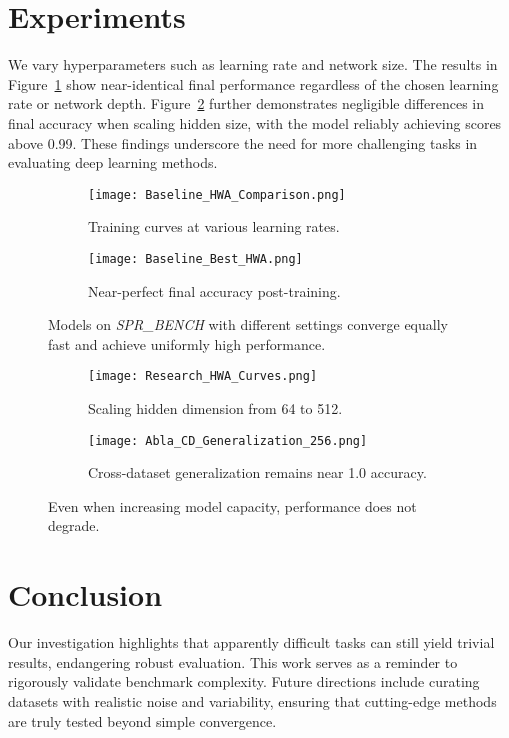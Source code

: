 \documentclass{article}
\begin{document}
\section{Experiments}
We vary hyperparameters such as learning rate and network size. The results in Figure~\ref{fig:baseline} show near-identical final performance regardless of the chosen learning rate or network depth. Figure~\ref{fig:research} further demonstrates negligible differences in final accuracy when scaling hidden size, with the model reliably achieving scores above 0.99. These findings underscore the need for more challenging tasks in evaluating deep learning methods.

\begin{figure}[t]
\centering
\begin{subfigure}[b]{0.45\textwidth}
    \texttt{[image: Baseline\_HWA\_Comparison.png]}
    \caption{Training curves at various learning rates.}
\end{subfigure}
\hfill
\begin{subfigure}[b]{0.45\textwidth}
    \texttt{[image: Baseline\_Best\_HWA.png]}
    \caption{Near-perfect final accuracy post-training.}
\end{subfigure}
\caption{Models on \textit{SPR\_BENCH} with different settings converge equally fast and achieve uniformly high performance.}
\label{fig:baseline}
\end{figure}

\begin{figure}[t]
\centering
\begin{subfigure}[b]{0.45\textwidth}
    \texttt{[image: Research\_HWA\_Curves.png]}
    \caption{Scaling hidden dimension from 64 to 512.}
\end{subfigure}
\hfill
\begin{subfigure}[b]{0.45\textwidth}
    \texttt{[image: Abla\_CD\_Generalization\_256.png]}
    \caption{Cross-dataset generalization remains near 1.0 accuracy.}
\end{subfigure}
\caption{Even when increasing model capacity, performance does not degrade.}
\label{fig:research}
\end{figure}

\section{Conclusion}
Our investigation highlights that apparently difficult tasks can still yield trivial results, endangering robust evaluation. This work serves as a reminder to rigorously validate benchmark complexity. Future directions include curating datasets with realistic noise and variability, ensuring that cutting-edge methods are truly tested beyond simple convergence.
\end{document}
